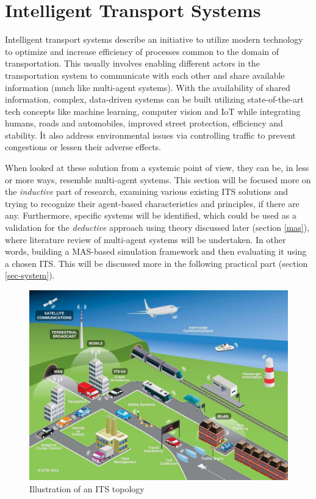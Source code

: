 \documentclass[main.tex]{subfiles}
\begin{document}
\section{Intelligent Transport Systems}\label{its}

Intelligent transport systems describe an initiative to utilize modern technology 
to optimize and increase efficiency of processes common to the domain of transportation. 
This usually involves enabling different actors in the transportation system to communicate 
with each other and share available information (much like multi-agent systems). With the 
availability of shared information, complex, data-driven systems can be built utilizing 
state-of-the-art tech concepts like machine learning, computer vision and IoT while
integrating humans, roads and automobiles, improved street protection, efficiency and stability.
İt also address environmental issues via controlling traffic to prevent congestions or lessen
their adverse effects. 

When looked at these solution from a systemic point of view, they can 
be, in less or more ways, resemble multi-agent systems. This section will be focused more on 
the \emph{inductive} part of research, examining various existing ITS solutions and trying 
to recognize their agent-based characteristics and principles, if there are any. Furthermore, 
specific systems will be identified, which could be used as a validation for the \emph{deductive}
approach using theory discussed later (section \ref{mas}), where literature review of multi-agent systems 
will be undertaken. In other words, building a MAS-based simulation framework and then evaluating it 
using a chosen ITS. This will be discussed more in the following practical part (section 
\ref{sec-system}).

\begin{figure}[htbp]
    \centering
    \includegraphics[width=.8\textwidth]{ITS-schema.jpg}
    \caption{Illustration of an ITS topology \cite{ETSI}}
    \label{its-map}
\end{figure}
\end{document}
